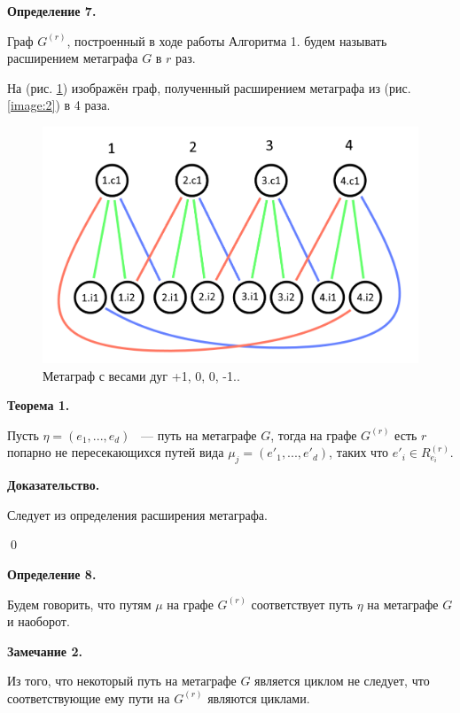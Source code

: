 \documentclass[14pt]{mmcs-article}
\begin{document}
\textbf{Определение 7.}

Граф $G^{(r)}$, построенный в ходе работы Алгоритма 1. будем называть расширением метаграфа $G$ в $r$ раз.

На (рис. \ref{image:3}) изображён граф, полученный расширением метаграфа из (рис. \ref{image:2}) в 4 раза.

\begin{figure}[H]
    \centering
    \includegraphics[scale=0.4]{Fig_1.png}
    \caption{ Метаграф с весами дуг +1, 0, 0, -1.. }
    \label{image:3}
\end{figure}

\textbf{Теорема 1.}

Пусть $\eta = (e_1, ..., e_d)$ ~--- путь на метаграфе $G$, тогда на графе $G^{(r)}$ есть $r$ попарно не пересекающихся путей вида $\mu_j = (e'_1, ..., e'_d)$, таких что $e'_i \in R^{(r)}_{e_i}$.

\textbf{Доказательство.}


Следует из определения расширения метаграфа.

\qed

\textbf{Определение 8.}


Будем говорить, что путям $\mu$ на графе $G^{(r)}$ соответствует путь $\eta$ на метаграфе $G$ и наоборот.

\textbf{Замечание 2.}

Из того, что некоторый путь на метаграфе $G$ является циклом не следует, что соответствующие ему пути на $G^{(r)}$ являются циклами.
\end{document}
